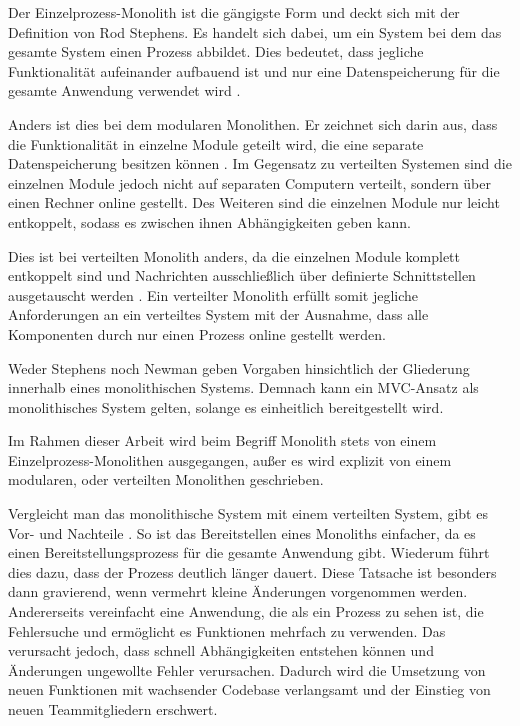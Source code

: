 Der Einzelprozess-Monolith ist die gängigste Form und deckt sich mit der Definition von Rod Stephens. Es handelt sich dabei, um ein System bei dem das gesamte System einen Prozess abbildet. Dies bedeutet, dass jegliche Funktionalität aufeinander aufbauend ist und nur eine Datenspeicherung für die gesamte Anwendung verwendet wird \parencite[vgl.][Kap. 2.2.1]{newman_monolith_2019}.

Anders ist dies bei dem modularen Monolithen. Er zeichnet sich darin aus, dass die Funktionalität in einzelne Module geteilt wird, die eine separate Datenspeicherung besitzen können \parencite[vgl.][Kap. 2.2.2]{newman_monolith_2019}. Im Gegensatz zu verteilten Systemen sind die einzelnen Module jedoch nicht auf separaten Computern verteilt, sondern über einen Rechner online gestellt. Des Weiteren sind die einzelnen Module nur leicht entkoppelt, sodass es zwischen ihnen Abhängigkeiten geben kann.

Dies ist bei verteilten Monolith anders, da die einzelnen Module komplett entkoppelt sind und Nachrichten ausschließlich über definierte Schnittstellen ausgetauscht werden \parencite[vgl.][S. 116]{starke_effektive_2015}. Ein verteilter Monolith erfüllt somit jegliche Anforderungen an ein verteiltes System mit der Ausnahme, dass alle Komponenten durch nur einen Prozess online gestellt werden.

Weder Stephens noch Newman geben Vorgaben hinsichtlich der Gliederung innerhalb eines monolithischen Systems. Demnach kann ein MVC-Ansatz als monolithisches System gelten, solange es einheitlich bereitgestellt wird.

Im Rahmen dieser Arbeit wird beim Begriff Monolith stets von einem Einzelprozess-Monolithen ausgegangen, außer es wird explizit von einem modularen, oder verteilten Monolithen geschrieben.

Vergleicht man das monolithische System mit einem verteilten System, gibt es Vor- und Nachteile \parencite[vgl.][Kap. 2.2.4 und Kap. 2.2.5]{newman_monolith_2019}. So ist das Bereitstellen eines Monoliths einfacher, da es einen Bereitstellungsprozess für die gesamte Anwendung gibt. Wiederum führt dies dazu, dass der Prozess deutlich länger dauert. Diese Tatsache ist besonders dann gravierend, wenn vermehrt kleine Änderungen vorgenommen werden. Andererseits vereinfacht eine Anwendung, die als ein Prozess zu sehen ist, die Fehlersuche und ermöglicht es Funktionen mehrfach zu verwenden. Das verursacht jedoch, dass schnell Abhängigkeiten entstehen können und Änderungen ungewollte Fehler verursachen. Dadurch wird die Umsetzung von neuen Funktionen mit wachsender Codebase verlangsamt und der Einstieg von neuen Teammitgliedern erschwert.

